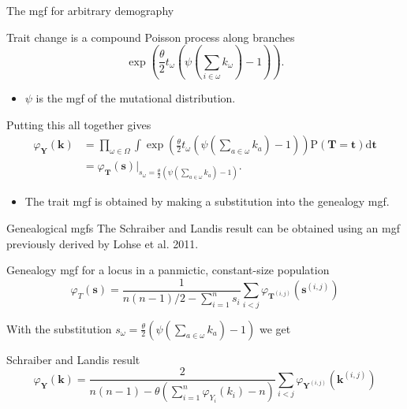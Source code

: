 \documentclass{beamer}
\newcommand{\Pro}{\mathrm{P}}
\begin{document}
\begin{frame}{The mgf for arbitrary demography}
  \begin{block}{Trait change is a compound Poisson process along branches}
    \begin{equation*}
        \exp\left( \frac{\theta}{2} t_{\omega} \left( \psi\left(\sum_{i \in \omega}k_{\omega}\right) -1 \right)\right).
    \end{equation*}
    \begin{itemize}
    \item $\psi$ is the mgf of the mutational distribution.
    \end{itemize}
  \end{block}
  \begin{block}{Putting this all together gives}
    \begin{align*}
      \varphi_{\mathbf{Y}}(\mathbf{k}) &= \prod_{\omega \in \Omega}
      \int \exp\left( \frac{\theta}{2} t_{\omega} \left( \psi\left(\sum_{a \in \omega}k_{a}\right) -1 \right)\right)
      \Pro(\mathbf{T}=\mathbf{t})\mbox{d}\mathbf{t} \\
      &=
      \varphi_{\mathbf{T}}(\mathbf{s})\Bigr|_{s_{\omega}=\frac{\theta}{2} \left( \psi\left(\sum_{a \in \omega}k_{a}\right) -1 \right)}.
    \end{align*}
    \begin{itemize}
    \item The trait mgf is obtained by making a substitution into the genealogy mgf.
    \end{itemize}
  \end{block}
\end{frame}

\begin{frame}{Genealogical mgfs}
  The Schraiber and Landis result can be obtained using an mgf previously
  derived by Lohse et al. 2011.
  \begin{block}{Genealogy mgf for a locus in a panmictic, constant-size population}
    \begin{equation*}
      \varphi_{T}(\mathbf{s}) = \frac{1}{n(n-1)/2 - \sum_{i=1}^n s_i}\sum_{i<j}\varphi_{\mathbf{T}^{(i,j)}}(\mathbf{s}^{(i,j)})
    \end{equation*}
  \end{block}
  With the substitution
  ${s_{\omega}=\frac{\theta}{2} \left( \psi\left(\sum_{a \in \omega}k_{a}\right) -1 \right)}$ we get
  \begin{block}{Schraiber and Landis result}
    \begin{equation*}
      \varphi_{\mathbf{Y}}(\mathbf{k}) = \frac{2}{n(n-1) - \theta \left( \sum_{i=1}^n \varphi_{Y_i}(k_i) - n \right)}
      \sum_{i<j} \varphi_{\mathbf{Y}^{(i,j)}}(\mathbf{k}^{(i,j)})
    \end{equation*}
  \end{block}
\end{frame}
\end{document}
